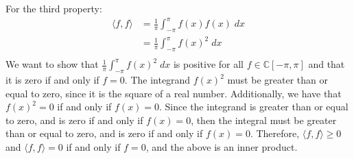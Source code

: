 \documentclass{article}
\begin{document}
\noindent For the third property: \\
\begin{align*}
    \langle f, f \rangle &= \frac{1}{\pi} \int_{-\pi}^{\pi} f(x)f(x)\;dx \\
    &= \frac{1}{\pi} \int_{-\pi}^{\pi} f(x)^2\;dx \\
\end{align*}
We want to show that $\frac{1}{\pi} \int_{-\pi}^{\pi} f(x)^2\;dx$ is positive for all $f \in \mathbb{C}[-\pi, \pi]$ and that it is zero if and only if $f = 0$.
The integrand $f(x)^2$ must be greater than or equal to zero, since it is the square of a real number.
Additionally, we have that $f(x)^2 = 0$ if and only if $f(x) = 0$.
Since the integrand is greater than or equal to zero, and is zero if and only if $f(x) = 0$, then the integral must be greater than or equal to zero, and is zero if and only if $f(x) = 0$.
Therefore, $\langle f, f \rangle \geq 0$ and $\langle f, f \rangle = 0$ if and only if $f = 0$,
and the above is an inner product.
\end{document}
